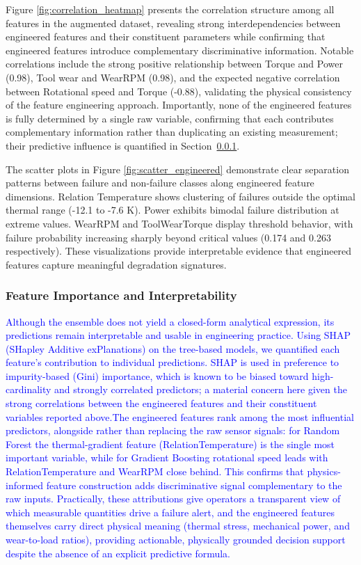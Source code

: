 \documentclass[final,5p, twocolumn]{elsarticle}
\begin{document}
Figure \ref{fig:correlation_heatmap} presents the correlation structure among all features in the augmented dataset, revealing strong interdependencies between engineered features and their constituent parameters while confirming that engineered features introduce complementary discriminative information. Notable correlations include the strong positive relationship between Torque and Power (0.98), Tool wear and WearRPM (0.98), and the expected negative correlation between Rotational speed and Torque (-0.88), validating the physical consistency of the feature engineering approach. Importantly, none of the engineered features is fully determined by a single raw variable, confirming that each contributes complementary information rather than duplicating an existing measurement; their predictive influence is quantified in Section~\ref{sec:interpretability}.

The scatter plots in Figure \ref{fig:scatter_engineered} demonstrate clear separation patterns between failure and non-failure classes along engineered feature dimensions. Relation Temperature shows clustering of failures outside the optimal thermal range (-12.1 to -7.6 K). Power exhibits bimodal failure distribution at extreme values. WearRPM and ToolWearTorque display threshold behavior, with failure probability increasing sharply beyond critical values (0.174 and 0.263 respectively). These visualizations provide interpretable evidence that engineered features capture meaningful degradation signatures.

\subsubsection{Feature Importance and Interpretability}
\label{sec:interpretability}
\textcolor{blue}{Although the ensemble does not yield a closed-form analytical expression, its predictions remain interpretable and usable in engineering practice. Using SHAP (SHapley Additive exPlanations) on the tree-based models, we quantified each feature's contribution to individual predictions. SHAP is used in preference to impurity-based (Gini) importance, which is known to be biased toward high-cardinality and strongly correlated predictors; a material concern here given the strong correlations between the engineered features and their constituent variables reported above.The engineered features rank among the most influential predictors, alongside rather than replacing the raw sensor signals: for Random Forest the thermal-gradient feature (RelationTemperature) is the single most important variable, while for Gradient Boosting rotational speed leads with RelationTemperature and WearRPM close behind. This confirms that physics-informed feature construction adds discriminative signal complementary to the raw inputs. Practically, these attributions give operators a transparent view of which measurable quantities drive a failure alert, and the engineered features themselves carry direct physical meaning (thermal stress, mechanical power, and wear-to-load ratios), providing actionable, physically grounded decision support despite the absence of an explicit predictive formula.}
\end{document}
